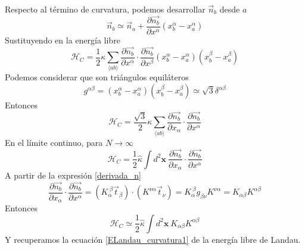 Respecto al término de curvatura, podemos desarrollar $\vec{n}_{b}$ desde $a$
\begin{equation}
\vec{n}_b\simeq\vec{n}_a+\frac{\partial \vec{n_b}}{\partial x^{\alpha}}(x_b^{\alpha}-x_a^{\alpha})
\end{equation}
Sustituyendo en la energía libre
\begin{equation}
\mathcal{H}_C=\frac{1}{2}\kappa\sum_{\langle ab\rangle}\frac{\partial
  \vec{n_b}}{\partial x^{\alpha}}\cdot\frac{\partial \vec{n_b}}{\partial x^{\beta}} (x_b^{\alpha}-x_a^{\alpha})(x_b^{\beta}-x_a^{\beta})
\end{equation}
Podemos considerar que son triángulos equiláteros
\begin{equation}
g^{\alpha\beta}=(x_b^{\alpha}-x_a^{\alpha})(x_b^{\beta}-x_a^{\beta})\simeq
\sqrt{3} \delta^{\alpha\beta}
\end{equation}
Entonces
\begin{equation}
\mathcal{H}_C=\frac{\sqrt{3}}{2}\kappa\sum_{\langle ab\rangle}\frac{\partial
  \vec{n_b}}{\partial x_{\alpha}}\cdot\frac{\partial \vec{n_b}}{\partial x^{\alpha}}
\end{equation}
En el límite continuo, para $N\rightarrow \infty$
\begin{equation}
\mathcal{H}_C=\frac{1}{2}\hat{\kappa}\int d^2\mathbf{x}\ \frac{\partial
  \vec{n_b}}{\partial x_{\alpha}}\cdot\frac{\partial \vec{n_b}}{\partial x^{\alpha}}
\end{equation}
A partir de la expresión \eqref{derivada_n}
\begin{equation}
\frac{\partial \vec{n_b}}{\partial x_{\alpha}}\cdot\frac{\partial
  \vec{n_b}}{\partial x^{\alpha}}=(K_{\alpha}^{\ \beta}\vec{t}_ {\beta})\cdot(K^{\nu
  \alpha}\vec{t}_{\nu})=K_{\alpha}^{\ \beta}g_ {\beta\nu}K^{\nu \alpha}=K_{\alpha\beta}K^{\alpha\beta}
\end{equation}
Entonces 
\begin{equation}
\mathcal{H}_C\simeq\frac{1}{2}\hat{\kappa}\int d^2\mathbf{x}\ K_{\alpha\beta}K^{\alpha\beta}
\end{equation}
Y recuperamos la ecuación \eqref{ELandau_curvatura1} de la energía libre de Landau.

